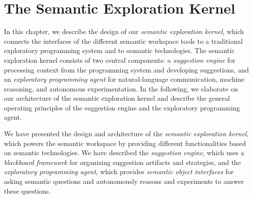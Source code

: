 
\chapter{The Semantic Exploration Kernel}
\label{cha:design}

In this chapter, we describe the design of our \emph{semantic exploration kernel}, which connects the interfaces of the different semantic workspace tools to a traditional exploratory programming system and to semantic technologies.
The semantic exploration kernel consists of two central components: a \emph{suggestion engine} for processing context from the programming system and developing suggestions, and an \emph{exploratory programming agent} for natural-language communication, machine reasoning, and autonomous experimentation.
In the following, we elaborate on our architecture of the semantic exploration kernel and describe the general operating principles of the suggestion engine and the exploratory programming agent.


\begin{summary}
	We have presented the design and architecture of the \emph{semantic exploration kernel}, which powers the semantic workspace by providing different functionalities based on semantic technologies.
	We have described the \emph{suggestion engine}, which uses a \emph{blackboard framework} for organizing suggestion artifacts and strategies, and the \emph{exploratory programming agent}, which provides \emph{semantic object interfaces} for asking semantic questions and autonomously reasons and experiments to answer these questions.
\end{summary}
